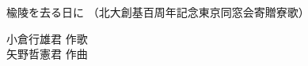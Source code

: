 \documentclass[10pt,b5j]{tarticle} %
\begin{document}
\begin{minipage}[c]{0.7\hsize} %
    \begin{center}
        {\LARGE
            楡陵を去る日に %
        }
        {\small 
            （北大創基百周年記念東京同窓会寄贈寮歌） %
        }
    \end{center}
\end{minipage}
\begin{minipage}[c]{0.3\hsize} %
    \begin{flushright} %
        小倉行雄君 作歌\\矢野哲憲君 作曲 %
    \end{flushright}
\end{minipage}
\end{document}
